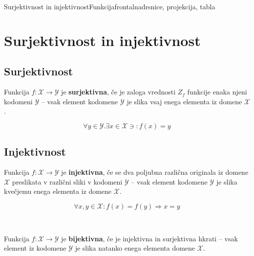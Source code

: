 \begin{priprava}{4}{}{Surjektivnost in injektivnost}{Funkcija}{frontalna}{drsnice, projekcija, tabla}




        \section{Surjektivnost in injektivnost}

            \subsection*{Surjektivnost}
                Funkcija $f:\mathcal{X}\to\mathcal{Y}$ je \textbf{surjektivna}, če je zaloga vrednosti $Z_f$ funkcije enaka njeni kodomeni $\mathcal{Y}$ -- vsak element kodomene $\mathcal{Y}$ je slika vsaj enega elementa iz domene $\mathcal{X}$.

                $$\forall y\in\mathcal{Y}. \exists x\in\mathcal{X}\ni:f(x)=y$$

            \subsection*{Injektivnost}
                Funkcija $f:\mathcal{X}\to\mathcal{Y}$ je \textbf{injektivna}, če se dva poljubna različna originala iz domene $\mathcal{X}$ preslikata v različni sliki v kodomeni $\mathcal{Y}$ -- vsak element kodomene $\mathcal{Y}$ je slika kvečjemu enega elementa iz domene $\mathcal{X}$.

                $$\forall x,y\in\mathcal{X}: f(x)=f(y)\Rightarrow x=y$$


~

            Funkcija $f:\mathcal{X}\to\mathcal{Y}$ je \textbf{bijektivna}, če je injektivna in surjektivna hkrati -- vsak element iz kodomene $\mathcal{Y}$ je slika natanko enega elementa domene $\mathcal{X}$.


            ~\\~\\


\end{priprava}
